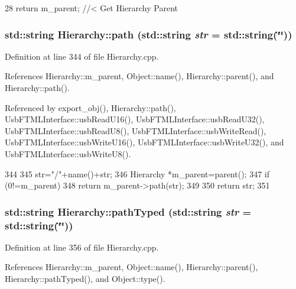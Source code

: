 \begin{DoxyCode}
28 { return m_parent; }  //< Get Hierarchy Parent
\end{DoxyCode}
\hypertarget{classHierarchy_aa7990fa7caf132d83e361ce033c6c65a}{
\subsubsection[{path}]{\setlength{\rightskip}{0pt plus 5cm}std::string Hierarchy::path (std::string {\em str} = {\ttfamily std::string(\char`\"{}\char`\"{})})}}
\label{classHierarchy_aa7990fa7caf132d83e361ce033c6c65a}


Definition at line 344 of file Hierarchy.cpp.

References Hierarchy::m\_\-parent, Object::name(), Hierarchy::parent(), and Hierarchy::path().

Referenced by export\_\-obj(), Hierarchy::path(), UsbFTMLInterface::usbReadU16(), UsbFTMLInterface::usbReadU32(), UsbFTMLInterface::usbReadU8(), UsbFTMLInterface::usbWriteRead(), UsbFTMLInterface::usbWriteU16(), UsbFTMLInterface::usbWriteU32(), and UsbFTMLInterface::usbWriteU8().


\begin{DoxyCode}
344                                       {
345   str="/"+name()+str;
346   Hierarchy *m_parent=parent();
347   if (0!=m_parent){
348     return m_parent->path(str);
349   }
350   return str;
351 }
\end{DoxyCode}
\hypertarget{classHierarchy_a1efd56cd164d328d2002e53a10a19b8c}{
\subsubsection[{pathTyped}]{\setlength{\rightskip}{0pt plus 5cm}std::string Hierarchy::pathTyped (std::string {\em str} = {\ttfamily std::string(\char`\"{}\char`\"{})})}}
\label{classHierarchy_a1efd56cd164d328d2002e53a10a19b8c}


Definition at line 356 of file Hierarchy.cpp.

References Hierarchy::m\_\-parent, Object::name(), Hierarchy::parent(), Hierarchy::pathTyped(), and Object::type().

